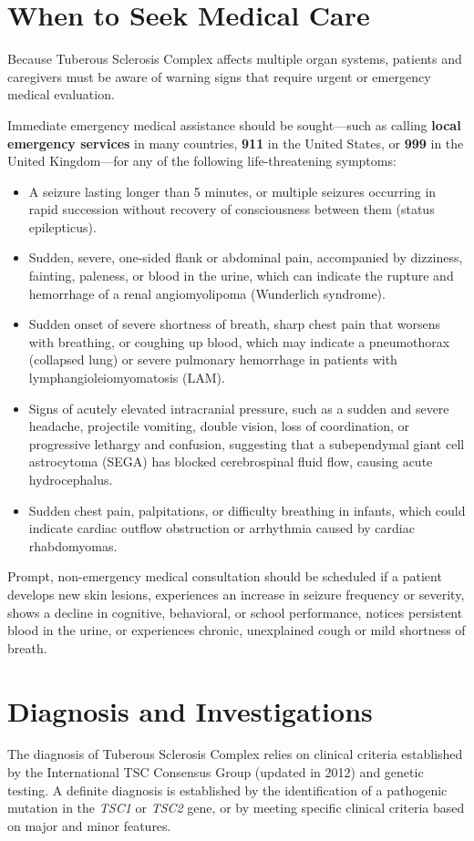\section*{When to Seek Medical Care}
Because Tuberous Sclerosis Complex affects multiple organ systems, patients and caregivers must be aware of warning signs that require urgent or emergency medical evaluation.

Immediate emergency medical assistance should be sought---such as calling \textbf{local emergency services} in many countries, \textbf{911} in the United States, or \textbf{999} in the United Kingdom---for any of the following life-threatening symptoms:
\begin{itemize}
    \item A seizure lasting longer than 5 minutes, or multiple seizures occurring in rapid succession without recovery of consciousness between them (status epilepticus).
    \item Sudden, severe, one-sided flank or abdominal pain, accompanied by dizziness, fainting, paleness, or blood in the urine, which can indicate the rupture and hemorrhage of a renal angiomyolipoma (Wunderlich syndrome).
    \item Sudden onset of severe shortness of breath, sharp chest pain that worsens with breathing, or coughing up blood, which may indicate a pneumothorax (collapsed lung) or severe pulmonary hemorrhage in patients with lymphangioleiomyomatosis (LAM).
    \item Signs of acutely elevated intracranial pressure, such as a sudden and severe headache, projectile vomiting, double vision, loss of coordination, or progressive lethargy and confusion, suggesting that a subependymal giant cell astrocytoma (SEGA) has blocked cerebrospinal fluid flow, causing acute hydrocephalus.
    \item Sudden chest pain, palpitations, or difficulty breathing in infants, which could indicate cardiac outflow obstruction or arrhythmia caused by cardiac rhabdomyomas.
\end{itemize}

Prompt, non-emergency medical consultation should be scheduled if a patient develops new skin lesions, experiences an increase in seizure frequency or severity, shows a decline in cognitive, behavioral, or school performance, notices persistent blood in the urine, or experiences chronic, unexplained cough or mild shortness of breath.

\section*{Diagnosis and Investigations}
The diagnosis of Tuberous Sclerosis Complex relies on clinical criteria established by the International TSC Consensus Group (updated in 2012) and genetic testing. A definite diagnosis is established by the identification of a pathogenic mutation in the \textit{TSC1} or \textit{TSC2} gene, or by meeting specific clinical criteria based on major and minor features.

